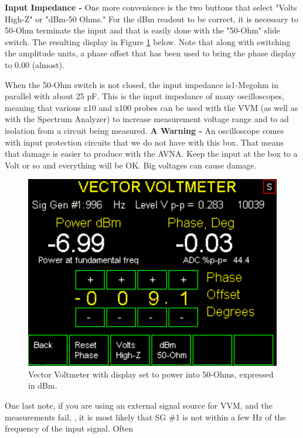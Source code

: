 \textbf{Input Impedance - }One more convenience is the two buttons that select "Volts High-Z" or "dBm-50 Ohms."  For the  dBm readout to be correct, it is necessary to 50-Ohm terminate the input and that is easily done with the "50-Ohm" slide switch.  The resulting display  in Figure  \ref{AVNA_018-label} below.  Note that along with switching the amplitude units,  a phase offset that has been used to bring the phase display to 0.00 (almost).

When the 50-Ohm switch is not closed, the input impedance is1-Megohm in parallel with about 25 pF.  This is the input impedance of many oscilloscopes, meaning that  various x10 and x100 probes can be used with the VVM (as well as with the Spectrum Analyzer) to increase measurement voltage range and to ad isolation from a circuit being measured. \textbf{A Warning - }An oscilloscope comes with input protection circuits that we do not have with this box. That means that damage is easier to produce with the AVNA. Keep the input at the box to a Volt or so and everything will be OK. Big voltages can cause damage. 
%
\begin{figure}[H]
\begin{center}
\includegraphics[scale=0.75]{./images/AVNA_018.pdf}
\caption{Vector Voltmeter with display set to power into 50-Ohms, expressed in dBm.}
\label{AVNA_018-label}
\end{center}
\end{figure}
%

One last note, if you are using an external signal source for VVM, and the measurements fail, , it is most likely that SG \#1 is not within a few Hz of the frequency of the input signal.  Often


